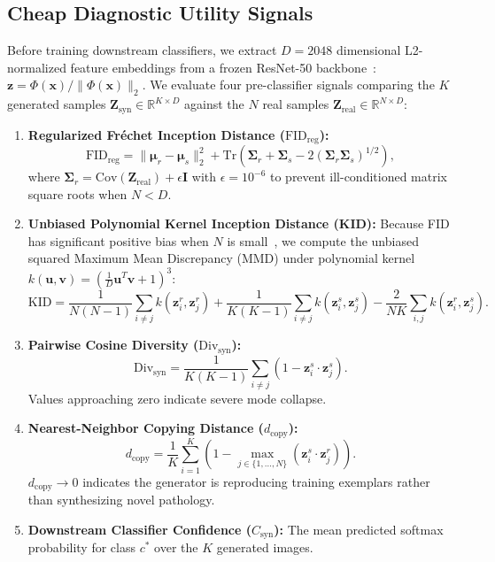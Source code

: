 \documentclass[runningheads]{llncs}
\begin{document}
\subsection{Cheap Diagnostic Utility Signals}
Before training downstream classifiers, we extract $D=2048$ dimensional L2-normalized feature embeddings from a frozen ResNet-50 backbone~\cite{he2016deep}: $\mathbf{z} = \Phi(\mathbf{x}) / \|\Phi(\mathbf{x})\|_2$. We evaluate four pre-classifier signals comparing the $K$ generated samples $\mathbf{Z}_{\text{syn}} \in \mathbb{R}^{K \times D}$ against the $N$ real samples $\mathbf{Z}_{\text{real}} \in \mathbb{R}^{N \times D}$:

\begin{enumerate}
    \item \textbf{Regularized Fr\'echet Inception Distance ($\text{FID}_{\text{reg}}$):}
    \begin{equation}
        \text{FID}_{\text{reg}} = \|\boldsymbol{\mu}_r - \boldsymbol{\mu}_s\|_2^2 + \text{Tr}\left(\boldsymbol{\Sigma}_r + \boldsymbol{\Sigma}_s - 2(\boldsymbol{\Sigma}_r \boldsymbol{\Sigma}_s)^{1/2}\right),
    \end{equation}
    where $\boldsymbol{\Sigma}_r = \text{Cov}(\mathbf{Z}_{\text{real}}) + \epsilon \mathbf{I}$ with $\epsilon = 10^{-6}$ to prevent ill-conditioned matrix square roots when $N < D$.
    \item \textbf{Unbiased Polynomial Kernel Inception Distance (KID):} Because FID has significant positive bias when $N$ is small~\cite{binkowski2018demystifying}, we compute the unbiased squared Maximum Mean Discrepancy (MMD) under polynomial kernel $k(\mathbf{u}, \mathbf{v}) = (\frac{1}{D}\mathbf{u}^T \mathbf{v} + 1)^3$:
    \begin{equation}
        \text{KID} = \frac{1}{N(N-1)}\sum_{i \neq j} k(\mathbf{z}_i^r, \mathbf{z}_j^r) + \frac{1}{K(K-1)}\sum_{i \neq j} k(\mathbf{z}_i^s, \mathbf{z}_j^s) - \frac{2}{NK}\sum_{i,j} k(\mathbf{z}_i^r, \mathbf{z}_j^s).
    \end{equation}
    \item \textbf{Pairwise Cosine Diversity ($\text{Div}_{\text{syn}}$):}
    \begin{equation}
        \text{Div}_{\text{syn}} = \frac{1}{K(K-1)} \sum_{i \neq j} (1 - \mathbf{z}_i^s \cdot \mathbf{z}_j^s).
    \end{equation}
    Values approaching zero indicate severe mode collapse.
    \item \textbf{Nearest-Neighbor Copying Distance ($d_{\text{copy}}$):}
    \begin{equation}
        d_{\text{copy}} = \frac{1}{K} \sum_{i=1}^K \left(1 - \max_{j \in \{1,\dots,N\}} (\mathbf{z}_i^s \cdot \mathbf{z}_j^r)\right).
    \end{equation}
    $d_{\text{copy}} \to 0$ indicates the generator is reproducing training exemplars rather than synthesizing novel pathology.
    \item \textbf{Downstream Classifier Confidence ($C_{\text{syn}}$):} The mean predicted softmax probability for class $c^*$ over the $K$ generated images.
\end{enumerate}
\end{document}

